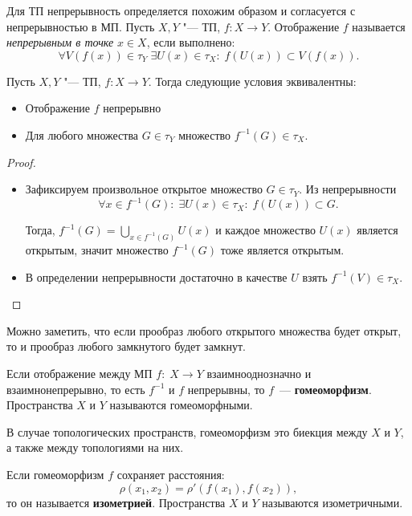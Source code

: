 \begin{note}
    Для ТП непрерывность определяется похожим образом и согласуется с непрерывностью в МП. Пусть $X, Y$ "--- ТП, $f : X \to Y$. Отображение $f$ называется \textit{непрерывным в точке} $x \in X$, если выполнено:
    \[\forall V(f(x)) \in \tau_Y\; \exists U(x) \in \tau_X:\; f(U(x)) \subset V(f(x)).\]
\end{note}

\begin{theorem}\label{thm1.4}
	Пусть $X, Y$ "--- ТП, $f: X \to Y$. Тогда следующие условия эквивалентны:
	\begin{itemize}
		\item Отображение $f$ непрерывно
		\item Для любого множества $G \in \tau_Y$ множество $f^{-1}(G) \in \tau_X$.
	\end{itemize}
\end{theorem}

\begin{proof}~
	\begin{itemize}
        \item{}Зафиксируем произвольное открытое множество $G \in \tau_Y$. Из непрерывности
        \[\forall x \in f^{-1}(G):\; \exists U(x) \in \tau_X:\; f(U(x)) \subset G.\]
        
        Тогда, $f^{-1}(G) = \bigcup\limits_{x \in f^{-1}(G)}U(x)$ и каждое множество $U(x)$ является открытым, значит множество $f^{-1}(G)$ тоже является открытым.

		\item{}В определении непрерывности достаточно в качестве $U$ взять $f^{-1}(V) \in \tau_X$.
	\end{itemize}
\end{proof}
\begin{note} \label{closed-continuous-closed}
Можно заметить, что если прообраз любого открытого множества будет открыт, то и прообраз любого замкнутого будет замкнут.
\end{note}

\begin{definition}
    Если отображение между МП $f:\; X \to Y$ взаимнооднозначно и взаимнонепрерывно, то есть $f^{-1}$ и $f$ непрерывны, то $f$~--- \textbf{гомеоморфизм}. Пространства $X$ и $Y$ называются гомеоморфными. 
\end{definition}

\begin{note}
    В случае топологических пространств, гомеоморфизм это биекция между $X$ и $Y$, а также между топологиями на них.
\end{note}

\begin{definition}
    Если гомеоморфизм $f$ сохраняет расстояния:
    \[
    \rho(x_1, x_2) = \rho'(f(x_1), f(x_2)),
    \]
    то он называется \textbf{изометрией}. Пространства $X$ и $Y$ называются изометричными. 
\end{definition}